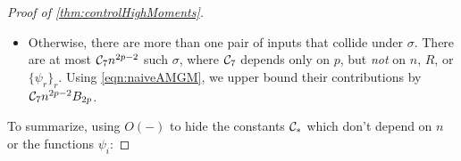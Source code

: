 \documentclass[main.tex]{subfiles}
\begin{document}
\begin{proof}[Proof of \cref{thm:controlHighMoments}]
\begin{itemize}
\begin{itemize}
\begin{align*}
                        \sum_{i=1}^n \|\psi^2_i\|_G
                            \sum_{\pi: [2p-2] \to [n] \setminus \{i\}}
                                \prod_{a=1}^{2p-2}
                                \|\psi_{\pi(a)}\|_G
                        \\
                    &\le
                        \CC_4 n^{-(p-1)/4} \binom p 2
                        \sum_{i=1}^n \|\psi^2_i\|_G
                            \sum_{\pi: [2p-2] \to [n]}
                                \prod_{a=1}^{2p-2}
                                \|\psi_{\pi(a)}\|_G
                        \\
                    &=
                        \CC_5
                        n^{-(p-1)/4}
                        \lp \sum_{i=1}^n \|\psi_i^2\|_G\rp
                        \lp \sum_{i=1}^n \|\psi_i\|_G\rp^{2p-2}
                        \\
                    &=
                        \CC_5 n^{1.75(p-1)} 
                        B''_{2p}
                        ,
                \end{align*}
                where $\CC_5 = \CC_4 \binom p 2$ and depends only on $p$, but \emph{not} on $n$, $R$, or $\{\psi_r\}_r$, and where we have set
                \[
                    B''_{2p}
                        =
                            \lp \f 1 n \sum_{i=1}^n \|\psi_i^2\|_G\rp
                            \lp \f 1 n \sum_{i=1}^n \|\psi_i\|_G\rp^{2p-2}.
                \]
            \item
                 Suppose for some $a, b \in [2p]$, $(\sigma(a)\sigma(b)) = \p{(ij)}t$ for $t \le R\sqrt n$.
                 There are at most $\binom{2p}{2} n \cdot R\sqrt n \cdot \binom{n-2}{2p-3} = \CC_6 n^{2p-1.5}$ such $\sigma$, where $\CC_6$ depends only on $p$ and $R$, but \emph{not} on $n$ or $\{\psi_r\}_r$.
                 Using \cref{eqn:naiveAMGM} again, we can upper bound the contribution of such $\sigma$ by $\CC_6 n^{2p-1.5} B_{2p}.$
        \end{itemize}
        \item Otherwise, there are more than one pair of inputs that collide under $\sigma$. 
        There are at most $\mathcal{C}_7 n^{2p-2}$ such $\sigma$, where $\mathcal{C}_7$ depends only on $p$, but \emph{not} on $n$, $R$, or $\{\psi_r\}_r$.
        Using \cref{eqn:naiveAMGM}, we upper bound their contributions by $\mathcal{C}_7 n^{2p-2} B_{2p}$.
\end{itemize}
To summarize, using $O(-)$ to hide the constants $\mathcal{C}_*$ which don't depend on $n$ or the functions $\psi_i$:

\end{proof}
\end{document}
